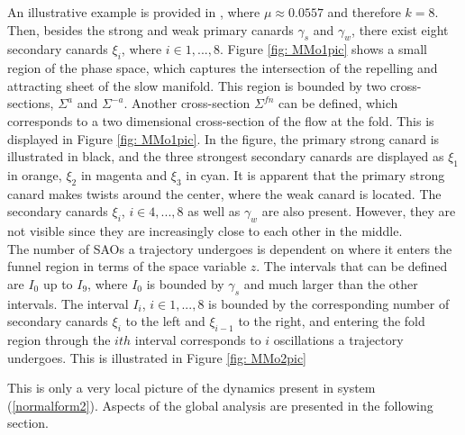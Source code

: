 An illustrative example is provided in \citep{MMO}, where $ \mu \approx 0.0557$ and therefore $k=8$. Then, besides the strong and weak primary canards $\gamma_s$ and $\gamma_w$, there exist eight secondary canards $\xi_i$, where $ i \in 1,...,8$.
Figure \ref{fig: MMo1pic} shows a small region of the phase space, which captures the intersection of the repelling and attracting sheet of the slow manifold. This region is bounded by two cross-sections, $\Sigma^a$ and $\Sigma^{-a}$.
Another cross-section $\Sigma^{fn}$ can be defined, which corresponds to a two dimensional cross-section of the flow at the fold. This is displayed in Figure \ref{fig: MMo1pic}. In the figure, the primary strong canard is illustrated in black, and the three strongest secondary canards are displayed as $\xi_1$ in orange, $\xi_2$ in magenta and $\xi_3$ in cyan. It is apparent that the primary strong canard makes  twists around the center, where the weak canard is located. The secondary canards $\xi_i$, $ i \in 4,...,8$ as well as $\gamma_w$ are also present. However, they are not visible since they are increasingly close to each other in the middle.\\

The number of SAOs a trajectory undergoes is dependent on where it enters the funnel region in terms of the space variable $z$. The intervals that can be defined are $I_0$ up to $I_9$, where $I_0$ is bounded by $\gamma_s$ and much larger than the other intervals. The interval $I_i$, $i \in 1, ..., 8$ is bounded by the corresponding number of secondary canards $\xi_i$ to the left and $\xi_{i-1}$ to the right, and entering the fold region through the $ith$ interval corresponds to $i$ oscillations a trajectory undergoes. This is illustrated in Figure \ref{fig: MMo2pic}

This is only a very local picture of the dynamics present in system (\ref{normalform2}). Aspects of the global analysis are presented in the following section.
